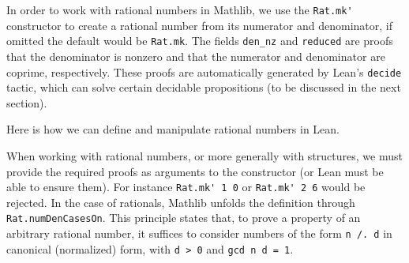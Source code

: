 In order to work with rational numbers in Mathlib, we use the
\lstinline[language=lean]|Rat.mk'| constructor to create a rational number from
its numerator and denominator, if omitted the default would be \lstinline[language=lean]|Rat.mk|.
The fields \lstinline[language=lean]|den_nz| and \lstinline[language=lean]|reduced| are proofs that 
the denominator is nonzero and that the numerator and denominator are coprime, respectively. 
These proofs are automatically generated by Lean's \lstinline[language=lean]|decide| tactic, which can 
solve certain decidable propositions (to be discussed in the next section).
\begin{example} 
  Here is how we can define and manipulate rational numbers in Lean.
\end{example}
When working with rational numbers, or more generally with structures, we must provide the 
required proofs as arguments to the constructor (or Lean must be able to ensure them).
For instance \lstinline[language=lean]|Rat.mk' 1 0| or \lstinline[language=lean]|Rat.mk' 2 6| would be rejected.
In the case of rationals, Mathlib unfolds the definition through
\lstinline[language=lean]|Rat.numDenCasesOn|. This principle states that, to prove a property of an 
arbitrary rational number, it suffices to consider numbers of the form \lstinline[language=lean]|n /. d| 
in canonical (normalized) form, with \lstinline[language=lean]|d > 0| and \lstinline[language=lean]|gcd n d = 1|.
